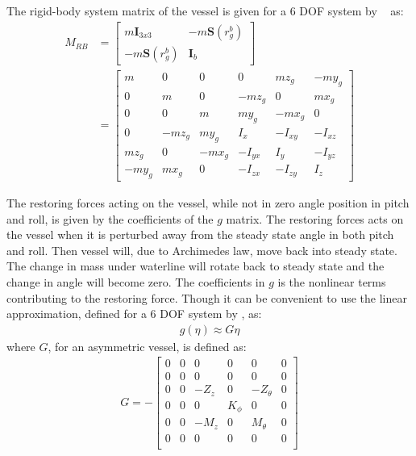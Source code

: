 The rigid-body system matrix of the vessel is given for a 6 \ac{DOF} system by ~\citep{fossen} as:
\begin{align}
M_{RB} &=
\begin{bmatrix}
m\boldsymbol{I}_{3x3} & -m\boldsymbol{S}(r^b_g)\\
-m\boldsymbol{S}(r^b_g) & \boldsymbol{I}_b
\end{bmatrix}
\nonumber\\
&=
\begin{bmatrix}
m & 0 & 0 & 0 & mz_g & -my_g\\
0 & m & 0 & -mz_g & 0 & mx_g\\
0 & 0 & m & my_g & -mx_g & 0\\
0 & -mz_g & my_g & I_x & -I_{xy} & -I_{xz}\\
mz_g & 0 & -mx_g & -I_{yx} & I_y & -I_{yz}\\
-my_g & mx_g & 0 & -I_{zx} & -I_{zy} & I_z
\end{bmatrix}
\end{align}

The restoring forces acting on the vessel, while not in zero angle position in pitch and roll, is given by the coefficients of the $g$ matrix. The restoring forces acts on the vessel when it is perturbed away from the steady state angle in both pitch and roll. Then vessel will, due to Archimedes law, move back into steady state. The change in mass under waterline will rotate back to steady state and the change in angle will become zero. The coefficients in $g$ is the nonlinear terms contributing to the restoring force. Though it can be convenient to use the linear approximation, defined for a 6 \ac{DOF} system by \citep{fossen}, as:
\begin{align}
g(\eta) \approx G\eta
\end{align}
where $G$, for an asymmetric vessel, is defined as:
\begin{align}
G = -
\begin{bmatrix}
0 & 0 & 0 & 0 & 0 & 0\\
0 & 0 & 0 & 0 & 0 & 0\\
0 & 0 & -Z_z & 0 & -Z_\theta & 0\\
0 & 0 & 0 & K_\phi & 0 & 0\\
0 & 0 & -M_z & 0 & M_\theta & 0\\
0 & 0 & 0 & 0 & 0 & 0\\
\end{bmatrix}
\end{align}

